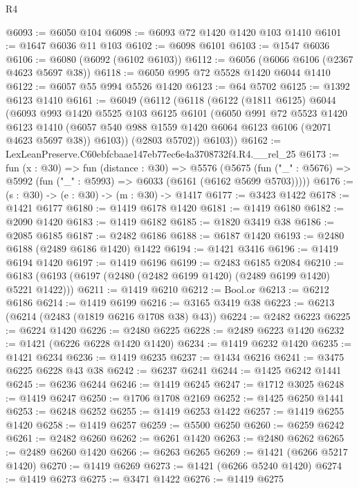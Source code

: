 \begin{lexlean}{R4}
\begin{coremodule}
@6093 := @6050 @104
@6098 := @6093 @72 @1420 @1420 @103 @1410
@6101 := @1647 @6036 @11 @103
@6102 := @6098 @6101
@6103 := @1547 @6036
@6106 := @6080 (@6092 (@6102 @6103))
@6112 := @6056 (@6066 @6106 (@2367 @4623 @5697 @38))
@6118 := @6050 @995 @72 @5528 @1420 @6044 @1410
@6122 := @6057 @55 @994 @5526 @1420
@6123 := @64 @5702
@6125 := @1392 @6123 @1410
@6161 := @6049
    (@6112
      (@6118
        (@6122
          (@1811 @6125)
          @6044
          (@6093
            @993
            @1420
            @5525
            @103
            @6125
            @6101
            (@6050
              @991
              @72
              @5523
              @1420
              @6123
              @1410
              (@6057 @540 @988 @1559 @1420 @6064 @6123 @6106 (@2071 @4623 @5697 @38))
              @6103))
          (@2803 @5702))
        @6103))
@6162 := LexLeanPreserve.C60ebfcbaae147eb77ec6e4a3708732f4.R4.__rel_25
@6173 := fun (x : @30) =>
  fun (distance : @30) =>
  @5576
    (@5675 (fun ("_" : @5676) => @5992 (fun ("_" : @5993) => @6033 (@6161 (@6162 @5699 @5703)))))
@6176 := (s : @30) -> (e : @30) -> (m : @30) -> @1417
@6177 := @3423 @1422
@6178 := @1421 @6177
@6180 := @1419 @6178 @1420
@6181 := @1419 @6180
@6182 := @2090 @1420
@6183 := @1419 @6182
@6185 := @1820 @3419 @38
@6186 := @2085 @6185
@6187 := @2482 @6186
@6188 := @6187 @1420
@6193 := @2480 @6188 (@2489 @6186 @1420) @1422
@6194 := @1421 @3416
@6196 := @1419 @6194 @1420
@6197 := @1419 @6196
@6199 := @2483 @6185 @2084
@6210 := @6183 (@6193 (@6197 (@2480 (@2482 @6199 @1420) (@2489 @6199 @1420) @5221 @1422)))
@6211 := @1419 @6210
@6212 := Bool.or
@6213 := @6212 @6186
@6214 := @1419 @6199
@6216 := @3165 @3419 @38
@6223 := @6213 (@6214 (@2483 (@1819 @6216 @1708 @38) @43))
@6224 := @2482 @6223
@6225 := @6224 @1420
@6226 := @2480 @6225
@6228 := @2489 @6223 @1420
@6232 := @1421 (@6226 @6228 @1420 @1420)
@6234 := @1419 @6232 @1420
@6235 := @1421 @6234
@6236 := @1419 @6235
@6237 := @1434 @6216
@6241 := @3475 @6225 @6228 @43 @38
@6242 := @6237 @6241
@6244 := @1425 @6242 @1441
@6245 := @6236 @6244
@6246 := @1419 @6245
@6247 := @1712 @3025
@6248 := @1419 @6247
@6250 := @1706 @1708 @2169
@6252 := @1425 @6250 @1441
@6253 := @6248 @6252
@6255 := @1419 @6253 @1422
@6257 := @1419 @6255 @1420
@6258 := @1419 @6257
@6259 := @5500 @6250
@6260 := @6259 @6242
@6261 := @2482 @6260
@6262 := @6261 @1420
@6263 := @2480 @6262
@6265 := @2489 @6260 @1420
@6266 := @6263 @6265
@6269 := @1421 (@6266 @5217 @1420)
@6270 := @1419 @6269
@6273 := @1421 (@6266 @5240 @1420)
@6274 := @1419 @6273
@6275 := @3471 @1422
@6276 := @1419 @6275

\end{coremodule}
\end{lexlean}
